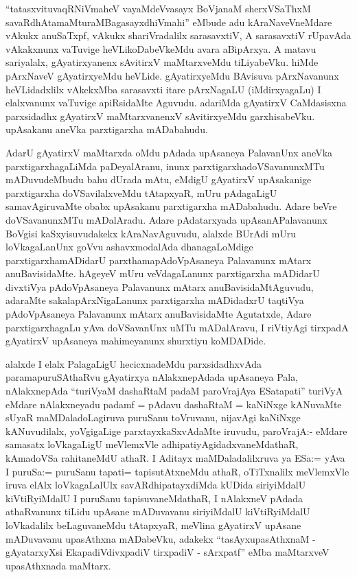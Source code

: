 
\begin{artha}
``tatasxvituvaqRNiVmaheV vayaMdeVvasayx BoVjanaM sherxVSaThxM savaRdhAtamaMturaMBagasayxdhiVmahi'' eMbude adu kAraNaveVneMdare vAkukx anuSaTxpf, vAkukx shariVradalilx sarasavxtiV, A sarasavxtiV rUpavAda vAkakxnunx vaTuvige heVLikoDabeVkeMdu avara aBipArxya. A matavu sariyalalx, gAyatirxyanenx sAvitirxV maMtarxveMdu tiLiyabeVku. hiMde pArxNaveV gAyatirxyeMdu heVLide. gAyatirxyeMdu BAvisuva pArxNavanunx heVLidadxlilx vAkekxMba sarasavxti itare pArxNagaLU (iMdirxyagaLu) I elalxvanunx vaTuvige apiRsidaMte Aguvudu. adariMda gAyatirxV CaMdasisxna parxsidadhx gAyatirxV maMtarxvanenxV sAvitirxyeMdu garxhisabeVku. upAsakanu aneVka parxtigarxha mADabahudu. 

AdarU gAyatirxV maMtarxda oMdu pAdada upAsaneya PalavanUnx aneVka parxtigarxhagaLiMda paDeyalAranu, inunx parxtigarxhadoVSavanunxMTu mADuvudeMbudu bahu dUrada mAtu, eMdigU gAyatirxV upAsakanige parxtigarxha doVSavilalxveMdu tAtapxyaR, mUru pAdagaLigU samavAgiruvaMte obabx upAsakanu parxtigarxha mADabahudu. Adare beVre doVSavanunxMTu mADalAradu. Adare pAdatarxyada upAsanAPalavanunx BoVgisi kaSxyisuvudakekx kAraNavAguvudu, alalxde BUrAdi mUru loVkagaLanUnx goVvu ashavxmodalAda dhanagaLoMdige parxtigarxhamADidarU parxthamapAdoVpAsaneya Palavanunx mAtarx anuBavisidaMte. hAgeyeV mUru veVdagaLanunx parxtigarxha mADidarU divxtiVya pAdoVpAsaneya Palavanunx mAtarx anuBavisidaMtAguvudu, adaraMte sakalapArxNigaLanunx parxtigarxha mADidadxrU taqtiVya pAdoVpAsaneya Palavanunx mAtarx anuBavisidaMte Agutatxde, Adare parxtigarxhagaLu yAva doVSavanUnx uMTu mADalAravu, I riVtiyAgi tirxpadA gAyatirxV upAsaneya mahimeyanunx shurxtiyu koMDADide. 

alalxde I elalx PalagaLigU hecicxnadeMdu parxsidadhxvAda paramapuruSAthaRvu gAyatirxya nAlakxnepAdada upAsaneya Pala, nAlakxnepAda ``turiVyaM dashaRtaM padaM paroVrajAya ESatapati'' turiVyA eMdare nAlakxneyadu padamf = pAdavu dashaRtaM = kaNiNxge kANuvaMte sUyaR maMDaladoLagiruva puruSanu toVruvanu, nijavAgi kaNiNxge kANuvudilalx, yoVgigaLige parxtayxkaSxvAdaMte iruvudu, paroVrajA:- eMdare samasatx loVkagaLigU meVlemxVle adhipatiyAgidadxvaneMdathaR, kAmadoVSa rahitaneMdU athaR. I Aditayx maMDaladalilxruva ya ESa:= yAva I puruSa:= puruSanu tapati= tapisutAtxneMdu athaR, oTiTxnalilx meVlemxVle iruva elAlx loVkagaLalUlx savARdhipatayxdiMda kUDida siriyiMdalU kiVtiRyiMdalU I puruSanu tapisuvaneMdathaR, I nAlakxneV pAdada athaRvanunx tiLidu upAsane mADuvavanu siriyiMdalU kiVtiRyiMdalU loVkadalilx beLaguvaneMdu tAtapxyaR, meVlina gAyatirxV upAsane mADuvavanu upasAthxna mADabeVku, adakekx ``tasAyxupasAthxnaM - gAyatarxyXsi EkapadiVdivxpadiV tirxpadiV - sArxpatf'' eMba maMtarxveV upasAthxnada maMtarx. 


\end{artha}
